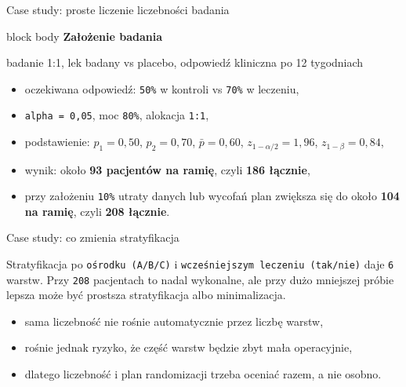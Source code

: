 \begin{frame}{Case study: proste liczenie liczebności badania}
  \begin{beamercolorbox}[wd=\linewidth,sep=0.8em,rounded=true]{block body}
    \textbf{\textcolor{UAFMDarkBlue}{Założenie badania}}\par\medskip
    badanie 1:1, lek badany vs placebo, odpowiedź kliniczna po 12 tygodniach
  \end{beamercolorbox}

  \vspace{0.25cm}

  \begin{itemize}
    \item oczekiwana odpowiedź: \texttt{50\%} w kontroli vs \texttt{70\%} w leczeniu,
    \item \texttt{alpha = 0{,}05}, moc \texttt{80\%}, alokacja \texttt{1:1},
    \item podstawienie: \(p_1=0{,}50\), \(p_2=0{,}70\), \(\bar{p}=0{,}60\), \(z_{1-\alpha/2}=1{,}96\), \(z_{1-\beta}=0{,}84\),
    \item wynik: około \textbf{93 pacjentów na ramię}, czyli \textbf{186 łącznie},
    \item przy założeniu \texttt{10\%} utraty danych lub wycofań plan zwiększa się do około \textbf{104 na ramię}, czyli \textbf{208 łącznie}.
  \end{itemize}
\end{frame}

\begin{frame}{Case study: co zmienia stratyfikacja}
  \begin{ExampleBox}
    Stratyfikacja po \texttt{ośrodku (A/B/C)} i \texttt{wcześniejszym leczeniu (tak/nie)} daje \texttt{6} warstw. Przy \texttt{208} pacjentach to nadal wykonalne, ale przy dużo mniejszej próbie lepsza może być prostsza stratyfikacja albo minimalizacja.
  \end{ExampleBox}

  \vspace{0.25cm}

  \begin{itemize}
    \item sama liczebność nie rośnie automatycznie przez liczbę warstw,
    \item rośnie jednak ryzyko, że część warstw będzie zbyt mała operacyjnie,
    \item dlatego liczebność i plan randomizacji trzeba oceniać razem, a nie osobno.
  \end{itemize}
\end{frame}


